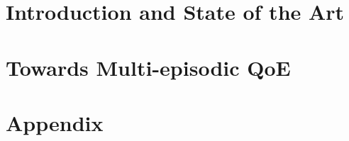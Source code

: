 \documentclass[
		openright,titlepage,numbers=noenddot,headinclude,%
                footinclude=true,cleardoublepage=empty,
                BCOR=5mm,paper=a4,fontsize=11pt, %
                ngerman,american, %
                ]{scrreprt}
\begin{document}
\cleardoublepage


\part{Introduction and State of the Art}\cleardoublepage
{} %
\setcounter{page}{1} %






\part{Towards Multi-episodic QoE}\cleardoublepage






\part{Appendix}\cleardoublepage
{} %
\setcounter{page}{1}



\cleardoublepage %



\end{document}
